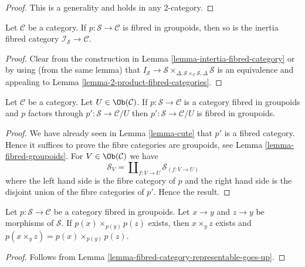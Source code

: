 \begin{proof}
This is a generality and holds in any $2$-category.
\end{proof}

\begin{lemma}
\label{lemma-inertia-fibred-groupoids}
Let $\mathcal{C}$ be a category.
If $p : \mathcal{S} \to \mathcal{C}$ is fibred in groupoids, then
so is the inertia fibred category $\mathcal{I}_\mathcal{S} \to \mathcal{C}$.
\end{lemma}

\begin{proof}
Clear from the construction in
Lemma \ref{lemma-intertia-fibred-category}
or by using (from the same lemma) that
$I_\mathcal{S} \to \mathcal{S}
\times_{\Delta, \mathcal{S} \times_\mathcal{C} \mathcal{S}, \Delta}\mathcal{S}$
is an equivalence and appealing to
Lemma \ref{lemma-2-product-fibred-categories}.
\end{proof}

\begin{lemma}
\label{lemma-cute-groupoids}
Let $\mathcal{C}$ be a category. Let $U \in \Ob(\mathcal{C})$.
If $p : \mathcal{S} \to \mathcal{C}$ is a category fibred in groupoids
and $p$ factors through $p' : \mathcal{S} \to \mathcal{C}/U$
then $p' : \mathcal{S} \to \mathcal{C}/U$ is fibred in groupoids.
\end{lemma}

\begin{proof}
We have already seen in Lemma \ref{lemma-cute} that $p'$ is a fibred
category. Hence it suffices to prove the fibre categories are groupoids,
see Lemma \ref{lemma-fibred-groupoids}.
For $V \in \Ob(\mathcal{C})$ we have
$$
\mathcal{S}_V = \coprod\nolimits_{f : V \to U} \mathcal{S}_{(f : V \to U)}
$$
where the left hand side is the fibre category of $p$ and the right hand side
is the disjoint union of the fibre categories of $p'$.
Hence the result.
\end{proof}

\begin{lemma}
\label{lemma-fibred-groupoids-fibre-product-goes-up}
Let $p : \mathcal{S} \to \mathcal{C}$ be a category fibred in groupoids.
Let $x \to y$ and $z \to y$ be morphisms of $\mathcal{S}$.
If $p(x) \times_{p(y)} p(z)$ exists, then
$x \times_y z$ exists and $p(x \times_y z) = p(x) \times_{p(y)} p(z)$.
\end{lemma}

\begin{proof}
Follows from
Lemma \ref{lemma-fibred-category-representable-goes-up}.
\end{proof}


